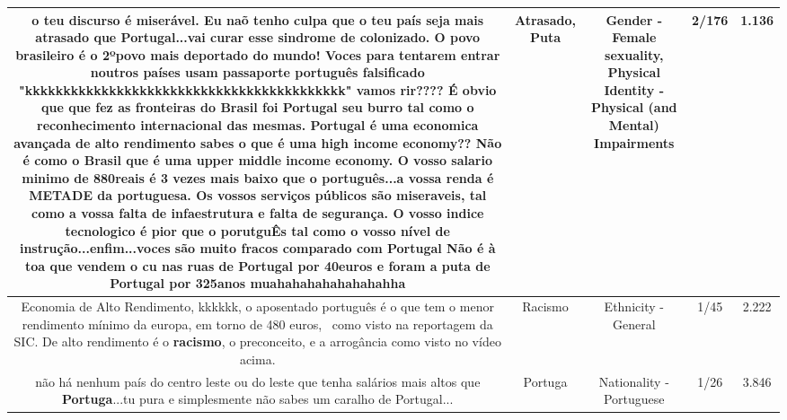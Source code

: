 \documentclass[11pt]{article}
\newlength\mylength
\begin{document}
\begin{center}
\begin{longtable}{|C{.65\mylength}|C{.30\mylength}|C{.12\mylength}|C{.12\mylength}|C{.12\mylength}|}
  \small o teu discurso é miserável.  Eu naõ tenho culpa que o teu país seja mais \textbf{atrasado} que Portugal...vai curar esse sindrome de colonizado. O povo brasileiro é o 2ºpovo mais deportado do mundo! Voces para tentarem entrar noutros países usam passaporte português falsificado "kkkkkkkkkkkkkkkkkkkkkkkkkkkkkkkkkkkkkkkkkk" vamos rir???? É obvio que que fez as fronteiras do Brasil foi Portugal seu burro tal como o reconhecimento internacional das mesmas. Portugal é uma economica avançada de alto rendimento sabes o que é uma high income economy?? Não é como o Brasil que é uma upper middle income economy.  O vosso salario minimo de 880reais é 3 vezes mais baixo que o português...a vossa renda é METADE da portuguesa. Os vossos serviços públicos são miseraveis, tal como a vossa falta de infaestrutura e falta de segurança. O vosso indice tecnologico é pior que o porutguÊs tal como o vosso nível de instrução...enfim...voces são muito fracos comparado com Portugal Não é à toa que vendem o cu nas ruas de Portugal por 40euros e foram a \textbf{puta} de Portugal por 325anos muahahahahahahahahha\normalsize   & Atrasado, Puta & Gender - Female sexuality, Physical Identity - Physical (and Mental) Impairments & 2/176 & 1.136 \\  \hline
  \small Economia de Alto Rendimento, kkkkkk, o aposentado português é o que tem o menor rendimento mínimo da europa, em torno de 480 euros,  como visto na reportagem da SIC. De alto rendimento é o \textbf{racismo}, o preconceito, e a arrogância como visto no vídeo acima.\normalsize   & Racismo & Ethnicity - General & 1/45 & 2.222 \\  \hline
  \small não há nenhum país do centro leste ou do leste que tenha salários mais altos que \textbf{Portuga}...tu pura e simplesmente não sabes um caralho de Portugal...\normalsize   & Portuga & Nationality - Portuguese & 1/26 & 3.846 \\  \hline

\end{longtable}
\end{center}
\end{document}

